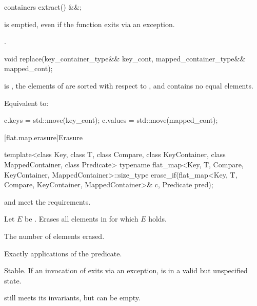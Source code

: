 %
\begin{itemdecl}
containers extract() &&;
\end{itemdecl}

\begin{itemdescr}
\pnum
\ensures
{} is emptied, even if the function exits via an exception.

\pnum
\returns
{}.
\end{itemdescr}

%
\begin{itemdecl}
void replace(key_container_type&& key_cont, mapped_container_type&& mapped_cont);
\end{itemdecl}

\begin{itemdescr}
\pnum
\expects
{} is ,
the elements of  are sorted with respect to , and
 contains no equal elements.

\pnum
\effects
Equivalent to:
\begin{codeblock}
c.keys = std::move(key_cont);
c.values = std::move(mapped_cont);
\end{codeblock}
\end{itemdescr}

[flat.map.erasure]{Erasure}

%
\begin{itemdecl}
template<class Key, class T, class Compare, class KeyContainer, class MappedContainer,
         class Predicate>
  typename flat_map<Key, T, Compare, KeyContainer, MappedContainer>::size_type
    erase_if(flat_map<Key, T, Compare, KeyContainer, MappedContainer>& c, Predicate pred);
\end{itemdecl}

\begin{itemdescr}
\pnum
\expects
{} and  meet the  requirements.

\pnum
\effects
Let $E$ be .
Erases all elements  in  for which $E$ holds.

\pnum
\returns
The number of elements erased.

\pnum
\complexity
Exactly  applications of the predicate.

\pnum
\remarks
Stable.
If an invocation of  exits via an exception,
 is in a valid but unspecified state.
\begin{note}
 still meets its invariants,
but can be empty.
\end{note}
\end{itemdescr}

